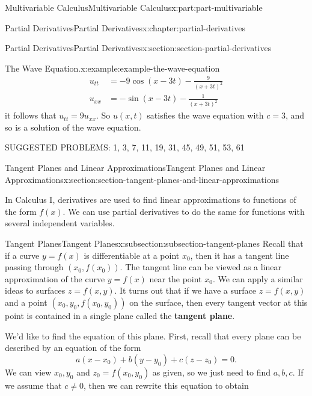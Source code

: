\documentclass[twoside,10pt,]{book}
\newcommand{\terminology}[1]{\textbf{#1}}
\numberwithin{equation}{part}
\begin{document}
\begin{partptx}{Multivariable Calculus}{}{Multivariable Calculus}{}{}{x:part:part-multivariable}
\begin{chapterptx}{Partial Derivatives}{}{Partial Derivatives}{}{}{x:chapter:partial-derivatives}
\begin{sectionptx}{Partial Derivatives}{}{Partial Derivatives}{}{}{x:section:section-partial-derivatives}
\begin{example}{The Wave Equation.}{x:example:example-the-wave-equation}
\begin{align*}
u_{tt} & = -9\cos(x-3t) - \frac{9}{(x+3t)^{2}} \\
u_{xx} & = -\sin(x-3t) - \frac{1}{(x+3t)^{2}} 
\end{align*}
it follows that \(u_{tt} = 9u_{xx}\). So \(u(x,t)\) satisfies the wave equation with \(c=3\), and so is a solution of the wave equation.%
\end{example}
\begin{conclusion}{}%
SUGGESTED PROBLEMS: 1, 3, 7, 11, 19, 31, 45, 49, 51, 53, 61%
\end{conclusion}%
\end{sectionptx}
%
%
\typeout{************************************************}
\typeout{************************************************}
%
\begin{sectionptx}{Tangent Planes and Linear Approximations}{}{Tangent Planes and Linear Approximations}{}{}{x:section:section-tangent-planes-and-linear-approximations}
\begin{introduction}{}%
In Calculus I, derivatives are used to find linear approximations to functions of the form \(f(x)\). We can use partial derivatives to do the same for functions with several independent variables.%
\end{introduction}%
%
%
\typeout{************************************************}
\typeout{************************************************}
%
\begin{subsectionptx}{Tangent Planes}{}{Tangent Planes}{}{}{x:subsection:subsection-tangent-planes}
Recall that if a curve \(y=f(x)\) is differentiable at a point \(x_{0}\), then it has a tangent line passing through \((x_{0},f(x_{0})).\) The tangent line can be viewed as a linear approximation of the curve \(y=f(x)\) near the point \(x_{0}\). We can apply a similar ideas to surfaces \(z = f(x,y)\). It turns out that if we have a surface \(z = f(x,y)\) and a point \((x_{0},y_{0}, f(x_{0},y_{0}))\) on the surface, then every tangent vector at this point is contained in a single plane called the \terminology{tangent plane}.%
\par
We'd like to find the equation of this plane. First, recall that every plane can be described by an equation of the form%
\begin{equation*}
a(x-x_{0})+b(y-y_{0})+c(z-z_{0}) = 0.
\end{equation*}
We can view \(x_{0},y_{0}\) and \(z_{0} = f(x_{0},y_{0})\) as given, so we just need to find \(a,b,c\). If we assume that \(c\neq 0\), then we can rewrite this equation to obtain%

\end{subsectionptx}
\end{sectionptx}
\end{chapterptx}
\end{partptx}
\end{document}
